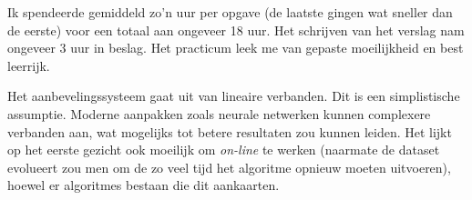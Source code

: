 
Ik spendeerde gemiddeld zo'n uur per opgave (de laatste gingen wat sneller dan de eerste) voor een totaal aan ongeveer 18 uur. Het schrijven van het verslag nam ongeveer 3 uur in beslag. Het practicum leek me van gepaste moeilijkheid en best leerrijk.\\

\par\noindent Het aanbevelingssysteem gaat uit van lineaire verbanden. Dit is een simplistische assumptie. Moderne aanpakken zoals neurale netwerken kunnen complexere verbanden aan, wat mogelijks tot betere resultaten zou kunnen leiden. Het lijkt op het eerste gezicht ook moeilijk om \textit{on-line} te werken (naarmate de dataset evolueert zou men om de zo veel tijd het algoritme opnieuw moeten uitvoeren), hoewel er algoritmes bestaan die dit aankaarten. 